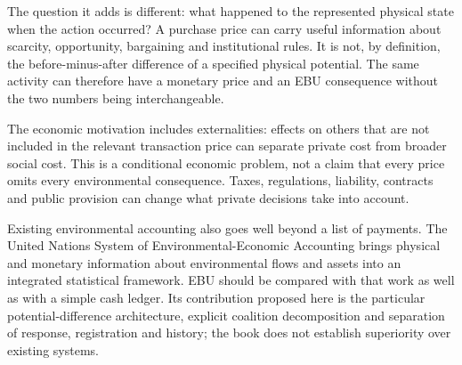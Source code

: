 The question it adds is different: what happened to the represented physical state when the action occurred? A purchase price can carry useful information about scarcity, opportunity, bargaining and institutional rules. It is not, by definition, the before-minus-after difference of a specified physical potential. The same activity can therefore have a monetary price and an EBU consequence without the two numbers being interchangeable.

The economic motivation includes externalities: effects on others that are not included in the relevant transaction price can separate private cost from broader social cost.\cite{intro-externality} This is a conditional economic problem, not a claim that every price omits every environmental consequence. Taxes, regulations, liability, contracts and public provision can change what private decisions take into account.

Existing environmental accounting also goes well beyond a list of payments. The United Nations System of Environmental-Economic Accounting brings physical and monetary information about environmental flows and assets into an integrated statistical framework.\cite{seea-framework} EBU should be compared with that work as well as with a simple cash ledger. Its contribution proposed here is the particular potential-difference architecture, explicit coalition decomposition and separation of response, registration and history; the book does not establish superiority over existing systems.

